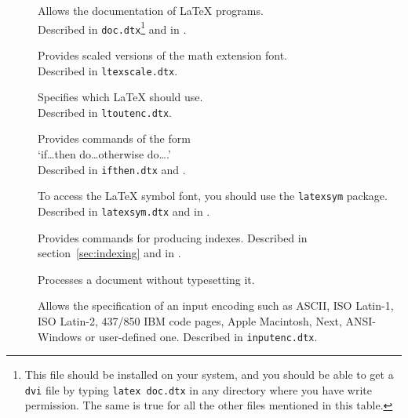 \begin{table}[!hbp]
\caption{Some of the Packages Distributed with \LaTeX.} \label{packages}
\begin{lined}{11cm}
\begin{description}
\item[\normalfont{}] Allows the documentation of \LaTeX{} programs.\\
 Described in \texttt{doc.dtx}\footnote{This file should be installed
   on your system, and you should be able to get a \texttt{dvi} file
   by typing \texttt{latex doc.dtx} in any directory where you have
   write permission. The same is true for all the
   other files mentioned in this table.}  and in \companion.

\item[\normalfont{}] Provides scaled versions of the
  math extension  font.\\ 
  Described in \texttt{ltexscale.dtx}.

\item[\normalfont{}] Specifies which 
  \LaTeX{} should use.\\
  Described in \texttt{ltoutenc.dtx}.

\item[\normalfont{}] Provides commands of the form\\ 
  `if\ldots then do\ldots otherwise do\ldots.'\\ Described in
  \texttt{ifthen.dtx} and \companion.

\item[\normalfont{}] To access the \LaTeX{} symbol
  font, you should use the \texttt{latexsym} package. Described in
  \texttt{latexsym.dtx} and in \companion.
 
\item[\normalfont{}] Provides commands for producing
  indexes.  Described in section~\ref{sec:indexing} and in \companion.

\item[\normalfont{}] Processes a document without
  typesetting it.
  
\item[\normalfont{}] Allows the specification of an
  input encoding such as ASCII, ISO Latin-1, ISO Latin-2, 437/850 IBM
  code pages,  Apple Macintosh, Next, ANSI-Windows or user-defined one.
  Described in \texttt{inputenc.dtx}. 
\end{description}
\end{lined}
\end{table}

